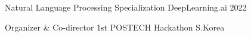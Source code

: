 

\begin{cvhonors}

  \cvhonor
    {Natural Language Processing Specialization} %
    {DeepLearning.ai} %
    {2022} %
    {}

  \cvhonor
    {Organizer \& Co-director} %
    {1st POSTECH Hackathon} %
    {S.Korea} %

\end{cvhonors}
